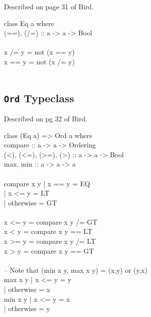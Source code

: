 \documentclass[11pt]{article}
\begin{document}
Described on page 31 of Bird.

\begin{program*}
\> class  Eq a  where   \\
\>         (==), (/=)  ::  a -> a -> Bool   \\
\>    \\
\>         x /= y  = not (x == y)   \\
\>         x == y  = not (x /= y)   \\
\>    \\
\end{program*}



\subsection{{\tt{Ord}} Typeclass}

Described on pg 32 of Bird.

\begin{program*}
\> class  (Eq a) => Ord a  where   \\
\>     compare              :: a -> a -> Ordering   \\
\>     (<), (<=), (>=), (>) :: a -> a -> Bool   \\
\>     max, min             :: a -> a -> a   \\
\>    \\
\>     compare x y | x == y    = EQ   \\
\>                 | x <= y    = LT   \\
\>                 | otherwise = GT   \\
\>    \\
\>     x <= y  = compare x y /= GT   \\
\>     x <  y  = compare x y == LT   \\
\>     x >= y  = compare x y /= LT   \\
\>     x >  y  = compare x y == GT   \\
\>    \\
\>     -- Note that (min x y, max x y) = (x,y) or (y,x)   \\
\>     max x y | x <= y    =  y   \\
\>             | otherwise =  x   \\
\>     min x y | x <= y    =  x   \\
\>             | otherwise =  y   \\
\>    \\
\end{program*}
\end{document}
